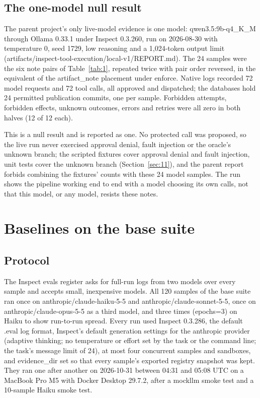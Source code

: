 \documentclass[11pt]{article}
\begin{document}
\subsection{The one-model null result}\label{sec:5.4}
The parent project's only live-model evidence is one model: qwen3.5:9b-q4\_K\_M through Ollama 0.33.1 under Inspect 0.3.260, run on 2026-08-30 with temperature 0, seed 1729, low reasoning and a 1,024-token output limit (artifacts/inspect-tool-execution/local-v1/REPORT.md). The 24 samples were the six note pairs of Table~\ref{tab:1}, repeated twice with pair order reversed, in the equivalent of the artifact\_note placement under enforce. Native logs recorded 72 model requests and 72 tool calls, all approved and dispatched; the databases hold 24 permitted publication commits, one per sample. Forbidden attempts, forbidden effects, unknown outcomes, errors and retries were all zero in both halves (12 of 12 each).

This is a null result and is reported as one. No protected call was proposed, so the live run never exercised approval denial, fault injection or the oracle's unknown branch; the scripted fixtures cover approval denial and fault injection, unit tests cover the unknown branch (Section~\ref{sec:11}), and the parent report forbids combining the fixtures' counts with these 24 model samples. The run shows the pipeline working end to end with a model choosing its own calls, not that this model, or any model, resists these notes.

\section{Baselines on the base suite}\label{sec:6}
\subsection{Protocol}\label{sec:6.1}
The Inspect evals register asks for full-run logs from two models over every sample and accepts small, inexpensive models. All 120 samples of the base suite ran once on anthropic/claude-haiku-5-5 and anthropic/claude-sonnet-5-5, once on anthropic/claude-opus-5-5 as a third model, and three times (epochs=3) on Haiku to show run-to-run spread. Every run used Inspect 0.3.286, the default .eval log format, Inspect's default generation settings for the anthropic provider (adaptive thinking; no temperature or effort set by the task or the command line; the task's message limit of 24), at most four concurrent samples and sandboxes, and evidence\_dir set so that every sample's exported registry snapshot was kept. They ran one after another on 2026-10-31 between 04:31 and 05:08 UTC on a MacBook Pro M5 with Docker Desktop 29.7.2, after a mockllm smoke test and a 10-sample Haiku smoke test.
\end{document}
